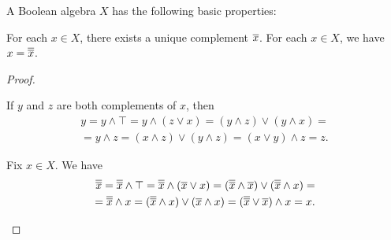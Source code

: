\begin{proposition}\label{thm:boolean_algebra_properties}
  A Boolean algebra \( X \) has the following basic properties:
  \begin{propenum}
     For each \( x \in X \), there exists a unique complement \( \overline{x} \).
     For each \( x \in X \), we have \( x = \overline{\overline{x}} \).
  \end{propenum}
\end{proposition}
\begin{proof}\mbox{}
  \begin{itemize}
     If \( y \) and \( z \) are both complements of \( x \), then
    \begin{align*}
      y
      =
      y \wedge \top
      =
      y \wedge (z \vee x)
      =
      (y \wedge z) \vee (y \wedge x)
      = \\ =
      y \wedge z
      =
      (x \wedge z) \vee (y \wedge z)
      =
      (x \vee y) \wedge z
      =
      z.
    \end{align*}

     Fix \( x \in X \). We have
    \begin{align*}
      \overline{\overline{x}}
      =
      \overline{\overline{x}} \wedge \top
      =
      \overline{\overline{x}} \wedge (\overline{x} \vee x)
      =
      (\overline{\overline{x}} \wedge \overline{x}) \vee (\overline{\overline{x}} \wedge x)
      = \\ =
      \overline{\overline{x}} \wedge x
      =
      (\overline{\overline{x}} \wedge x) \vee (\overline{x} \wedge x)
      =
      (\overline{\overline{x}} \vee \overline{x}) \wedge x
      =
      x.
    \end{align*}
  \end{itemize}
\end{proof}

